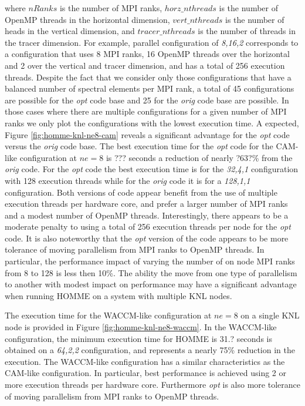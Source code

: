 where $nRanks$ is the number of MPI ranks, $horz\_nthreads$ is the number of OpenMP threads in the horizontal dimension, $vert\_nthreads$ is the number of heads in the vertical dimension, and $tracer\_nthreads$ is the number of threads in the tracer dimension.  For example,  parallel configuration of {\em 8,16,2} corresponds to a configuration that uses 8 MPI ranks, 16 OpenMP threads over the horizontal and 2 over the vertical and tracer dimension, and has a total of 256 execution threads.   Despite the fact that we consider only those configurations that have a balanced number of spectral elements per MPI rank,  a total of 45 configurations are possible for the {\em opt} code base and 25 for the {\em orig} code base are possible.  In those cases where there are multiple configurations for a given number of MPI ranks we only plot the configurations with the lowest execution time.  A expected, Figure \ref{fig:homme-knl-ne8-cam} reveals a significant advantage for the {\em opt} code versus the {\em orig} code base.  The best execution time for the {\em opt} code for the CAM-like configuration at $ne=8$ is {\color{red} ???} seconds a reduction of nearly {\color{red} ?63?\%} from the {\em orig} code.  For the {\em opt} code the best execution time is for the {\em 32,4,1} configuration with 128 execution threads while for the {\em orig} code it is for a {\em 128,1,1} configuration.  Both versions of code appear benefit from the use of multiple execution threads per hardware core, and prefer a larger number of MPI ranks and a modest number of OpenMP threads.  Interestingly, there appears to be a moderate penalty to using a total of 256 execution threads per node for the {\em opt} code.  It is also noteworthy that the {\em opt} version of the code appears to be more tolerance of moving parallelism from MPI ranks to OpenMP threads.  In particular, the performance impact of varying the number of on node MPI ranks from 8 to 128 is less then 10\%.  The ability the move from one type of parallelism to another with modest impact on performance may have a significant advantage when running HOMME on a system with multiple KNL nodes.  

The execution time for the WACCM-like configuration at $ne=8$ on a single KNL node is provided in Figure \ref{fig:homme-knl-ne8-waccm}.  In the WACCM-like configuration, the minimum execution time for HOMME is {\color{red} 31.?} seconds is obtained on a {\em 64,2,2} configuration, and represents a nearly 75\% reduction in the execution. The WACCM-like configuration has a similar characteristics as the CAM-like configuration. In particular, best performance is achieved using 2 or more execution threads per hardware core.  Furthermore {\em opt} is also more tolerance of moving parallelism from MPI ranks to OpenMP threads.  

